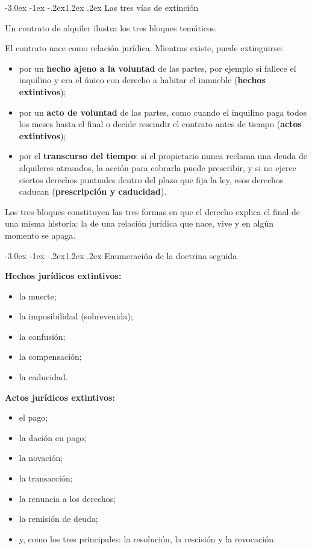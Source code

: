 \documentclass[12pt,oneside]{book}
\makeatletter
\renewcommand\section{\@startsection{section}{1}{\z@}%
  {-3.0ex \@plus -1ex \@minus -.2ex}{1.2ex \@plus .2ex}%
  {\normalfont\large\bfseries\color{acento}}}
\makeatother
\begin{document}
\section{Las tres vías de extinción}

Un contrato de alquiler ilustra los tres bloques temáticos.

\begin{ejemplo}
El contrato nace como relación jurídica. Mientras existe, puede extinguirse:
\begin{itemize}
    \item por un \textbf{hecho ajeno a la voluntad} de las partes, por ejemplo si fallece el inquilino y era el único con derecho a habitar el inmueble (\textbf{hechos extintivos});
    \item por un \textbf{acto de voluntad} de las partes, como cuando el inquilino paga todos los meses hasta el final o decide rescindir el contrato antes de tiempo (\textbf{actos extintivos});
    \item por el \textbf{transcurso del tiempo}: si el propietario nunca reclama una deuda de alquileres atrasados, la acción para cobrarla puede prescribir, y si no ejerce ciertos derechos puntuales dentro del plazo que fija la ley, esos derechos caducan (\textbf{prescripción y caducidad}).
\end{itemize}
\end{ejemplo}

Los tres bloques constituyen las tres formas en que el derecho explica el final de una misma historia: la de una relación jurídica que nace, vive y en algún momento se apaga.

\section{Enumeración de la doctrina seguida}

\textbf{Hechos jurídicos extintivos:}
\begin{itemize}
    \item la muerte;
    \item la imposibilidad (sobrevenida);
    \item la confusión;
    \item la compensación;
    \item la caducidad.
\end{itemize}

\textbf{Actos jurídicos extintivos:}
\begin{itemize}
    \item el pago;
    \item la dación en pago;
    \item la novación;
    \item la transacción;
    \item la renuncia a los derechos;
    \item la remisión de deuda;
    \item y, como los tres principales: la resolución, la rescisión y la revocación.
\end{itemize}
\end{document}
